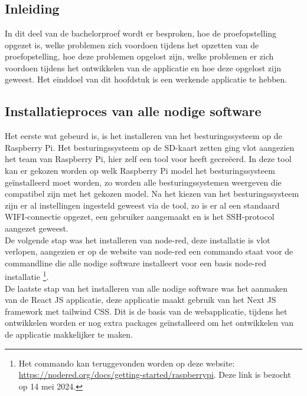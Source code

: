 \chapter{}
\label{ch:proefopstelling}

\section{Inleiding}
\label{sec:proefopstelling-inleiding}

In dit deel van de bachelorproef wordt er besproken, hoe de proefopstelling opgezet is, welke problemen zich voordoen tijdens het opzetten van de proefopstelling, hoe deze problemen opgelost zijn, welke problemen er zich voordoen tijdens het ontwikkelen van de applicatie en hoe deze opgelost zijn geweest. Het einddoel van dit hoofdstuk is een werkende applicatie te hebben.

\section{Installatieproces van alle nodige software}
\label{sec:proefopstelling-opzetten}

Het eerste wat gebeurd is, is het installeren van het besturingssysteem op de Raspberry Pi. Het besturingssysteem op de SD-kaart zetten ging vlot aangezien het team van Raspberry Pi, hier zelf een tool voor heeft gecreëerd. In deze tool kan er gekozen worden op welk Raspberry Pi model het besturingssysteem geïnstalleerd moet worden, zo worden alle besturingssystemen weergeven die compatibel zijn met het gekozen model. Na het kiezen van het besturingssysteem zijn er al instellingen ingesteld geweest via de tool, zo is er al een standaard WIFI-connectie opgezet, een gebruiker aangemaakt en is het SSH-protocol aangezet geweest.\\

De volgende stap was het installeren van node-red, deze installatie is vlot verlopen, aangezien er op de website van node-red een commando staat voor de commandline die alle nodige software installeert voor een basis node-red installatie \footnote{Het commando kan teruggevonden worden op deze website: \url{https://nodered.org/docs/getting-started/raspberrypi}. Deze link is bezocht op 14 mei 2024.}.\\

De laatste stap van het installeren van alle nodige software was het aanmaken van de React JS applicatie, deze applicatie maakt gebruik van het Next JS framework met tailwind CSS. Dit is de basis van de webapplicatie, tijdens het ontwikkelen worden er nog extra packages geïnstalleerd om het ontwikkelen van de applicatie makkelijker te maken.

